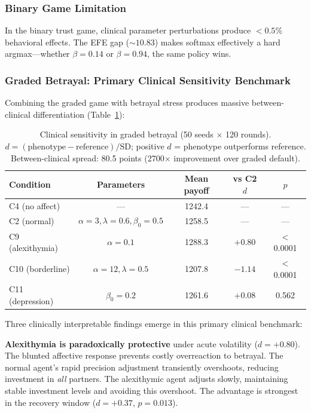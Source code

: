 \documentclass[11pt,a4paper]{article}
\begin{document}
\subsubsection{Binary Game Limitation}

In the binary trust game, clinical parameter perturbations produce $< 0.5\%$ behavioral effects. The EFE gap ($\sim\!10.83$) makes softmax effectively a hard argmax---whether $\beta = 0.14$ or $\beta = 0.94$, the same policy wins.

\subsubsection{Graded Betrayal: Primary Clinical Sensitivity Benchmark}

Combining the graded game with betrayal stress produces massive between-clinical differentiation (Table~\ref{tab:clinical}):

\begin{table}[ht]
\centering\small
\begin{tabular}{lcccc}
\toprule
Condition & Parameters & Mean payoff & vs C2 $d$ & $p$ \\
\midrule
C4 (no affect) & --- & 1242.4 & --- & --- \\
C2 (normal) & $\alpha\!=\!3, \lambda\!=\!0.6, \beta_0\!=\!0.5$ & 1258.5 & --- & --- \\
C9 (alexithymia) & $\alpha = 0.1$ & 1288.3 & $+0.80$ & $<$0.0001 \\
C10 (borderline) & $\alpha\!=\!12, \lambda\!=\!0.5$ & 1207.8 & $-1.14$ & $<$0.0001 \\
C11 (depression) & $\beta_0 = 0.2$ & 1261.6 & $+0.08$ & 0.562 \\
\bottomrule
\end{tabular}
\caption{Clinical sensitivity in graded betrayal (50 seeds $\times$ 120 rounds). $d = (\text{phenotype} - \text{reference})/\text{SD}$; positive $d$ = phenotype outperforms reference. Between-clinical spread: 80.5 points (2700$\times$ improvement over graded default).}
\label{tab:clinical}
\end{table}

Three clinically interpretable findings emerge in this primary clinical benchmark:

\textbf{Alexithymia is paradoxically protective} under acute volatility ($d = +0.80$). The blunted affective response prevents costly overreaction to betrayal. The normal agent's rapid precision adjustment transiently overshoots, reducing investment in \emph{all} partners. The alexithymic agent adjusts slowly, maintaining stable investment levels and avoiding this overshoot. The advantage is strongest in the recovery window ($d = +0.37$, $p = 0.013$).
\end{document}

